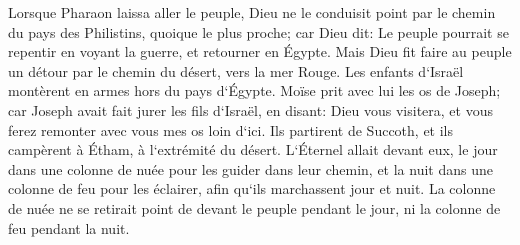 \verse Lorsque Pharaon laissa aller le peuple, Dieu ne le conduisit point par le chemin du pays des Philistins, quoique le plus proche; car Dieu dit: Le peuple pourrait se repentir en voyant la guerre, et retourner en Égypte. 
\verse Mais Dieu fit faire au peuple un détour par le chemin du désert, vers la mer Rouge. Les enfants d`Israël montèrent en armes hors du pays d`Égypte. 
\verse Moïse prit avec lui les os de Joseph; car Joseph avait fait jurer les fils d`Israël, en disant: Dieu vous visitera, et vous ferez remonter avec vous mes os loin d`ici. 
\verse Ils partirent de Succoth, et ils campèrent à Étham, à l`extrémité du désert. 
\verse L`Éternel allait devant eux, le jour dans une colonne de nuée pour les guider dans leur chemin, et la nuit dans une colonne de feu pour les éclairer, afin qu`ils marchassent jour et nuit. 
\verse La colonne de nuée ne se retirait point de devant le peuple pendant le jour, ni la colonne de feu pendant la nuit. 

